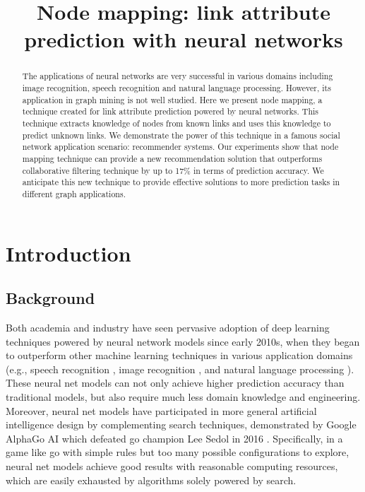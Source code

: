 \documentclass[twocolumn]{article}
\begin{document}
\lstset{language=python, tabsize=4}
\title{Node mapping: link attribute prediction with neural networks}
\maketitle

\begin{abstract}
	The applications of neural networks are very successful in various domains 
	including image recognition, speech recognition and natural language 
	processing.
	However, its application in graph mining is not well studied.
	Here we present node mapping, a technique created for link attribute 
	prediction powered by neural networks.
	This technique extracts knowledge of nodes from known links and uses this 
	knowledge to predict unknown links.
	We demonstrate the power of this technique in a famous social network 
	application scenario: recommender systems.
	Our experiments show that node mapping technique can provide a new
	recommendation solution that outperforms collaborative filtering 
	technique by up to 17\% in terms of prediction accuracy.
	We anticipate this new technique to provide effective solutions to more 
	prediction tasks in different graph applications.
\end{abstract}

\section{Introduction}

\subsection{Background}
Both academia and industry have seen pervasive adoption of deep learning 
techniques powered by neural network models since early 2010s,
when they began to outperform other machine learning techniques in various 
application domains (e.g., speech recognition \cite{hannun2014deep}, image 
recognition \cite{simonyan2014very}, and natural language processing 
\cite{yao2013recurrent}).
These neural net models can not only achieve higher prediction accuracy than 
traditional models,
but also require much less domain knowledge and engineering.
Moreover, neural net models have participated in more general artificial 
intelligence design by complementing search techniques, 
demonstrated by Google AlphaGo AI which defeated go champion Lee Sedol in 
2016 \cite{silver2016mastering}.
Specifically, in a game like go with simple rules but too many possible 
configurations to explore,
neural net models achieve good results with reasonable computing resources, 
which are easily exhausted by algorithms solely powered by search.
\end{document}
